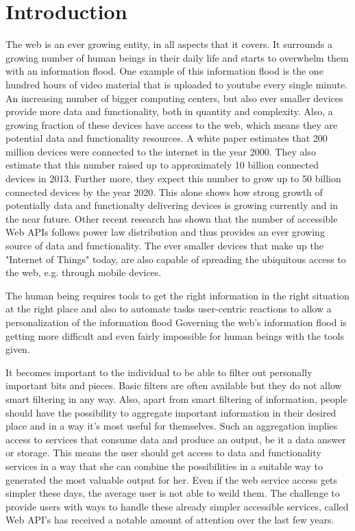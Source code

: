 
\chapter{Introduction}

The web is an ever growing entity, in all aspects that it covers.
It surrounds a growing number of human beings in their daily life and starts to overwhelm them with an information flood.
One example of this information flood is the one hundred hours of video material that is uploaded to youtube\cite{wwwYoutube} every single minute.
An increasing number of bigger computing centers, but also ever smaller devices provide more data and functionality, both in quantity and complexity.
Also, a growing fraction of these devices have access to the web, which means they are potential data and functionality resources.
A white paper\cite{citeulike:12243016} estimates that 200 million devices were connected to the internet in the year 2000.
They also estimate that this number raised up to approximately 10 billion connected devices in 2013.
Further more, they expect this number to grow up to 50 billion connected devices by the year 2020.
This alone shows how strong growth of potentially data and functionalty delivering devices is growing currently and in the near future.
Other recent research\cite{conf/icws/HuangFT12}\cite{wwwProgrammableWebResearch} has shown that the number of accessible Web APIs follows power law distribution and thus provides an ever growing source of data and functionality.
The ever smaller devices that make up the "Internet of Things"\cite{Weber2010} today, are also capable of spreading the ubiquitous access to the web, e.g. through mobile devices.

The human being requires tools to get the right information in the right situation at the right place and also to automate tasks
user-centric reactions to allow a personalization of the information flood
Governing the web's information flood is getting more difficult and even fairly impossible for human beings with the tools given.


It becomes important to the individual to be able to filter out personally important bits and pieces.
Basic filters are often available but they do not allow smart filtering in any way.
Also, apart from smart filtering of information, people should have the possibility to aggregate important information in their desired place and in a way it's most useful for themselves.
Such an aggregation implies access to services that consume data and produce an output, be it a data answer or storage.
This means the user should get access to data and functionality services in a way that she can combine the possibilities in a suitable way to generated the most valuable output for her.
Even if the web service access gets simpler these days, the average user is not able to weild them.
The challenge to provide users with ways to handle these already simpler accessible services, called Web API's has received a notable amount of attention over the last few years.


